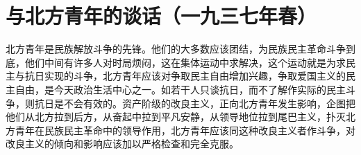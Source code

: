 \section[与北方青年的谈话（一九三七年春）]{与北方青年的谈话（一九三七年春）}


北方青年是民族解放斗争的先锋。他们的大多数应该团结，为民族民主革命斗争到底，他们中间有许多人对时局烦闷，这在集体运动中求解决，这个运动就是为求民主与抗日实现的斗争，北方青年应该对争取民主自由增加兴趣，争取爱国主义的民主自由，是今天政治生活中心之一。如若干人只谈抗日，而不了解作实际的民主斗争，则抗日是不会有效的。资产阶级的改良主义，正向北方青年发生影响，企图把他们从北方拉到后方，从奋起中拉到平凡安静，从领导地位拉到尾巴主义，扑灭北方青年在民族民主革命中的领导作用，北方青年应该同这种改良主义者作斗争，对改良主义的倾向和影响应该加以严格检查和完全克服。

